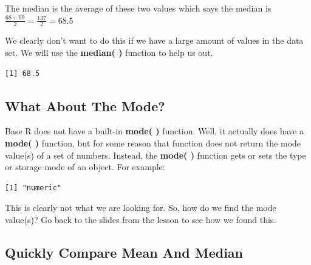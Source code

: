 \documentclass[
  letterpaper,
  DIV=11,
  numbers=noendperiod]{scrreprt}
\newenvironment{Shaded}{\begin{snugshade}}{\end{snugshade}}
\newcommand{\FunctionTok}[1]{\textcolor[rgb]{0.28,0.35,0.67}{#1}}
\newcommand{\NormalTok}[1]{\textcolor[rgb]{0.00,0.23,0.31}{#1}}
\newcommand{\SpecialCharTok}[1]{\textcolor[rgb]{0.37,0.37,0.37}{#1}}
\begin{document}
The median is the average of these two values which says the median is
\(\frac{68+69}{2} = \frac{137}{2} = 68.5\)

We clearly don't want to do this if we have a large amount of values in
the data set. We will use the \textbf{median( )} function to help us
out.

\begin{Shaded}
\end{Shaded}

\begin{verbatim}
[1] 68.5
\end{verbatim}

\subsection*{What About The Mode?}\label{what-about-the-mode}

Base R does not have a built-in \textbf{mode( )} function. Well, it
actually does have a \textbf{mode( )} function, but for some reason that
function does not return the mode value(s) of a set of numbers. Instead,
the \textbf{mode( )} function gets or sets the type or storage mode of
an object. For example:

\begin{Shaded}
\end{Shaded}

\begin{verbatim}
[1] "numeric"
\end{verbatim}

This is clearly not what we are looking for. So, how do we find the mode
value(s)? Go back to the slides from the lesson to see how we found
this.

\subsection*{Quickly Compare Mean And
Median}\label{quickly-compare-mean-and-median}
\end{document}
